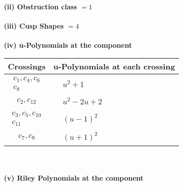 \documentclass[1p]{elsarticle_modified}
\theoremstyle{definition}
\begin{document}
\flushleft \textbf{(ii) Obstruction class $= 1$}\\~\\
\flushleft \textbf{(iii) Cusp Shapes $= 4$}\\~\\
\newpage\renewcommand{\arraystretch}{1}
\flushleft \textbf{(iv) u-Polynomials at the component}\newline \\
\begin{tabular}{m{50pt}|m{274pt}}
Crossings & \hspace{64pt}u-Polynomials at each crossing \\
\hline $$\begin{aligned}c_{1},c_{4},c_{6}\\c_{8}\end{aligned}$$&$\begin{aligned}
&u^2+1
\end{aligned}$\\
\hline $$\begin{aligned}c_{2},c_{12}\end{aligned}$$&$\begin{aligned}
&u^2-2 u+2
\end{aligned}$\\
\hline $$\begin{aligned}c_{3},c_{5},c_{10}\\c_{11}\end{aligned}$$&$\begin{aligned}
&(u-1)^2
\end{aligned}$\\
\hline $$\begin{aligned}c_{7},c_{9}\end{aligned}$$&$\begin{aligned}
&(u+1)^2
\end{aligned}$\\
\hline
\end{tabular}\\~\\
\newpage\renewcommand{\arraystretch}{1}
\flushleft \textbf{(v) Riley Polynomials at the component}\newline \\
\end{document}
